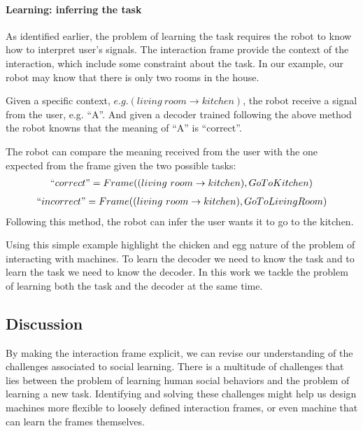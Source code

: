 \paragraph{Learning: inferring the task}

As identified earlier, the problem of learning the task requires the robot to know how to interpret user's signals. The interaction frame provide the context of the interaction, which include some constraint about the task. In our example, our robot may know that there is only two rooms in the house. 

Given a specific context, $e.g. (living~room \rightarrow kitchen)$, the robot receive a signal from the user, e.g. ``A''. And given a decoder trained following the above method the robot knowns that the meaning of ``A'' is ``correct''.

The robot can compare the meaning received from the user with the one expected from the frame given the two possible tasks:
%
\begin{eqnarray}
``correct" = Frame((living~room \rightarrow kitchen), Go To Kitchen) \nonumber
\end{eqnarray}
\begin{eqnarray}
``incorrect" = Frame((living~room \rightarrow kitchen), Go To Living Room) \nonumber
\end{eqnarray}
%
Following this method, the robot can infer the user wants it to go to the kitchen.

\transition

Using this simple example highlight the chicken and egg nature of the problem of interacting with machines. To learn the decoder we need to know the task and to learn the task we need to know the decoder. In this work we tackle the problem of learning both the task and the decoder at the same time.

\subsection{Discussion}

By making the interaction frame explicit, we can revise our understanding of the challenges associated to social learning. There is a multitude of challenges that lies between the problem of learning human social behaviors and the problem of learning a new task. Identifying and solving these challenges might help us design machines more flexible to loosely defined interaction frames, or even machine that can learn the frames themselves.

